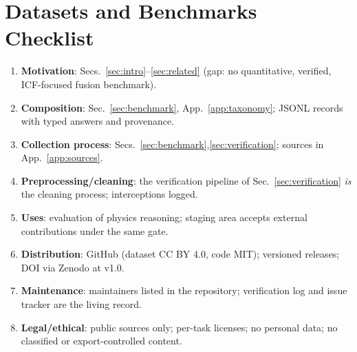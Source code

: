 \section{Datasets and Benchmarks Checklist}
\label{app:checklist}
\begin{enumerate}
    \item \textbf{Motivation}: Secs.~\ref{sec:intro}--\ref{sec:related} (gap: no quantitative, verified, ICF-focused fusion benchmark).
    \item \textbf{Composition}: Sec.~\ref{sec:benchmark}, App.~\ref{app:taxonomy}; JSONL records with typed answers and provenance.
    \item \textbf{Collection process}: Secs.~\ref{sec:benchmark},\ref{sec:verification}; sources in App.~\ref{app:sources}.
    \item \textbf{Preprocessing/cleaning}: the verification pipeline of Sec.~\ref{sec:verification} \emph{is} the cleaning process; interceptions logged.
    \item \textbf{Uses}: evaluation of physics reasoning; staging area accepts external contributions under the same gate.
    \item \textbf{Distribution}: GitHub (dataset CC BY 4.0, code MIT); versioned releases; DOI via Zenodo at v1.0.
    \item \textbf{Maintenance}: maintainers listed in the repository; verification log and issue tracker are the living record.
    \item \textbf{Legal/ethical}: public sources only; per-task licenses; no personal data; no classified or export-controlled content.
\end{enumerate}
